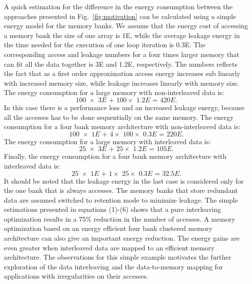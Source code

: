 \documentclass[prodmode,acmtecs]{acmsmall}
\begin{document}
A quick estimation for the difference in the energy consumption between the approaches presented in Fig.~\ref{fig:motivation} can be calculated using a simple energy model for the memory banks.
We assume that the energy cost of accessing a memory bank the size of one array is 1E, while the average leakage energy in the time needed for the execution of one loop iteration is 0.3E. 
The corresponding access and leakage numbers for a four times larger memory that can fit all the data together is  3E and 1.2E, respectively. 
The numbers reflects the fact that as a first order approximation access energy increases sub linearly with increased memory size, while leakage increases linearly with memory size. 
The energy consumption for a large memory with non-interleaved data is:
	\begin{equation}
		\textit{100 $\times$ 3E + 100$\times$ 1.2E = 420E}.
	\end{equation}	
In this case there is a performance loss and an increased leakage energy, because all the accesses has to be done sequentially on the same memory.	
The energy consumption for a four bank memory architecture with non-interleaved data is:
	\begin{equation}
		\textit{100 $\times$ 1E + 4$\times$ 100$\times$ 0.3E = 220E}.
	\end{equation}	
The energy consumption for a large memory with interleaved data is:
	\begin{equation}
		\textit{25 $\times$ 3E + 25$\times$ 1.2E = 105E}.
	\end{equation}	
Finally, the energy consumption for a four bank memory architecture with interleaved data is:
	\begin{equation}
		\textit{25 $\times$ 1E + 1$\times$ 25$\times$ 0.3E = 32.5E}.
	\end{equation}			
It should be noted that the leakage energy in the last case is considered only for the one bank that is always accesses.
The memory banks that store redundant data are assumed switched to retention mode to minimize leakage.
The simple estimations presented in equations (1)-(6) shows that a pure interleaving optimization results in a 75\% reduction in the number of accesses.
A memory optimization based on an energy efficient four bank clustered memory architecture can also give an important energy reduction.
The energy gains are even greater when interleaved data are mapped to an efficient memory architecture.
The observations for this simple example motivates the further exploration of the data interleaving and the data-to-memory mapping for applications with irregularities on their accesses. 
\end{document}

